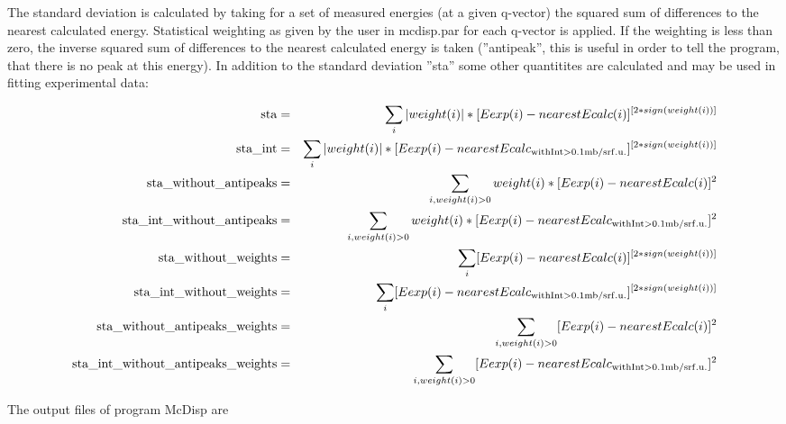 The standard deviation is calculated by taking for a set of measured energies (at a 
given q-vector) the squared sum of differences to the nearest
calculated energy. Statistical weighting as given by the user in {\prg mcdisp.par}
for each q-vector is applied. If the weighting is less than zero, the 
inverse squared sum of differences to the nearest
calculated energy is taken (''antipeak'', this is useful in order to 
tell the program, that there is no peak at this energy).
In addition to the standard deviation ''sta'' some other quantitites are calculated and 
may be used in fitting experimental data:

\begin{eqnarray}
{\rm sta}                              & =& \sum_i |weight(i)|*[Eexp(i) - nearestEcalc(i)]^{[2*sign(weight(i))]}\\
{\rm sta\_int   }                       & = &\sum_i |weight(i)|*[Eexp(i) - nearestEcalc_{\rm with %
Int>0.1mb/srf.u.}]^{[2*sign(weight(i))]}\\
{\rm sta\_without\_antipeaks }           & =& \sum_{i, weight(i)>0}  weight(i)*[Eexp(i) - nearestEcalc(i)]^2\\
{\rm sta\_int\_without\_antipeaks }       & =&\sum_{i,weight(i)>0}  weight(i)*[Eexp(i) - nearestEcalc_{\rm with %
Int>0.1mb/srf.u.}]^2\\
{\rm sta\_without\_weights }              &=& \sum_i [Eexp(i) - nearestEcalc(i)]^{[2*sign(weight(i))]}\\
{\rm sta\_int\_without\_weights}          & =&\sum_i [Eexp(i) - nearestEcalc_{\rm with %
Int>0.1mb/srf.u.}]^{[2*sign(weight(i))]}\\
{\rm sta\_without\_antipeaks\_weights}    & = &\sum_{i, weight(i)>0}[Eexp(i) - nearestEcalc(i)]^2\\
{\rm sta\_int\_without\_antipeaks\_weights}& =& \sum_{i, weight(i)>0} [Eexp(i) - nearestEcalc_{\rm with %
Int>0.1mb/srf.u.}]^2\\
\end{eqnarray}




The output files of program {\prg McDisp} are 


